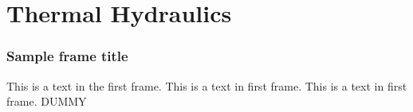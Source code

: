 \section{Thermal Hydraulics}
\label{sec:thermalHydraulics}

\begin{frame}
  \frametitle{Sample frame title}
  This is a text in the first frame. This is a text in first frame. This is a
  text in first frame. DUMMY
\end{frame}
